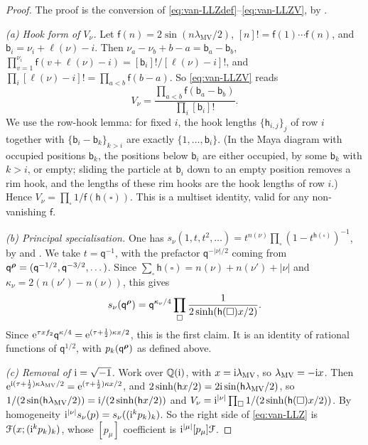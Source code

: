 \begin{proof}
The proof is the conversion of \eqref{eq:van-LLZdef}--\eqref{eq:van-LLZV}, by \cite[eq.~(1)--(3)]{LLZ03}.

\emph{(a) Hook form of $V_\nu$.} Let $\mathsf{f}(n)=2\sin(n\lambda_{\mathrm{MV}}/2)$, $[n]!=\mathsf{f}(1)\cdots\mathsf{f}(n)$, and $\mathsf{b}_i=\nu_i+\ell(\nu)-i$. Then $\nu_a-\nu_b+b-a=\mathsf{b}_a-\mathsf{b}_b$, $\prod_{v=1}^{\nu_i}\mathsf{f}(v+\ell(\nu)-i)=[\mathsf{b}_i]!/[\ell(\nu)-i]!$, and $\prod_i[\ell(\nu)-i]!=\prod_{a<b}\mathsf{f}(b-a)$. So \eqref{eq:van-LLZV} reads
\[
V_\nu=\frac{\prod_{a<b}\mathsf{f}(\mathsf{b}_a-\mathsf{b}_b)}{\prod_i[\mathsf{b}_i]!}.
\]
We use the row-hook lemma: for fixed $i$, the hook lengths $\{\mathsf{h}_{i,j}\}_j$ of row $i$ together with $\{\mathsf{b}_i-\mathsf{b}_k\}_{k>i}$ are exactly $\{1,\dots,\mathsf{b}_i\}$. (In the Maya diagram with occupied positions $\mathsf{b}_k$, the positions below $\mathsf{b}_i$ are either occupied, by some $\mathsf{b}_k$ with $k>i$, or empty; sliding the particle at $\mathsf{b}_i$ down to an empty position removes a rim hook, and the lengths of these rim hooks are the hook lengths of row $i$.) Hence $V_\nu=\prod_{\square}1/\mathsf{f}(\mathsf{h}(\square))$. This is a multiset identity, valid for any non-vanishing $\mathsf{f}$.

\emph{(b) Principal specialisation.} One has $s_\nu(1,t,t^2,\dots)=t^{n(\nu)}\prod_{\square}(1-t^{\mathsf{h}(\square)})^{-1}$, by \cite[eq.~(12)]{LLZ03} and \cite[I.3, Ex.~2]{Mac95}. We take $t=\mathsf{q}^{-1}$, with the prefactor $\mathsf{q}^{-\lvert\nu\rvert/2}$ coming from $\mathsf{q}^{\boldsymbol{\rho}}=(\mathsf{q}^{-1/2},\mathsf{q}^{-3/2},\dots)$. Since $\sum_{\square}\mathsf{h}(\square)=n(\nu)+n(\nu')+\lvert\nu\rvert$ and $\kappa_\nu=2(n(\nu')-n(\nu))$, this gives
\[
s_\nu(\mathsf{q}^{\boldsymbol{\rho}})=\mathsf{q}^{\kappa_\nu/4}\prod_{\square}\frac{1}{2\sinh(\mathsf{h}(\square)x/2)}.
\]
Since $\mathrm{e}^{\tau xf_2}\mathsf{q}^{\kappa/4}=\mathrm{e}^{(\tau+\frac12)\kappa x/2}$, this is the first claim. It is an identity of rational functions of $\mathsf{q}^{1/2}$, with $p_k(\mathsf{q}^{\boldsymbol{\rho}})$ as defined above.

\emph{(c) Removal of $\mathrm{i}=\sqrt{-1}$.} Work over $\mathbb{Q}(\mathrm{i})$, with $x=\mathrm{i}\lambda_{\mathrm{MV}}$, so $\lambda_{\mathrm{MV}}=-\mathrm{i} x$. Then $\mathrm{e}^{\mathrm{i}(\tau+\frac12)\kappa\lambda_{\mathrm{MV}}/2}=\mathrm{e}^{(\tau+\frac12)\kappa x/2}$, and $2\sinh(\mathsf{h}x/2)=2\mathrm{i}\sin(\mathsf{h}\lambda_{\mathrm{MV}}/2)$, so $1/(2\sin(\mathsf{h}\lambda_{\mathrm{MV}}/2))=\mathrm{i}/(2\sinh(\mathsf{h}x/2))$ and $V_\nu=\mathrm{i}^{\lvert\nu\rvert}\prod_{\square}1/(2\sinh(\mathsf{h}(\square)x/2))$. By homogeneity $\mathrm{i}^{\lvert\nu\rvert}s_\nu(p)=s_\nu((\mathrm{i}^kp_k)_k)$. So the right side of \eqref{eq:van-LLZ} is $\mathcal{F}(x;(\mathrm{i}^kp_k)_k)$, whose $[p_\mu]$ coefficient is $\mathrm{i}^{\lvert\mu\rvert}[p_\mu]\mathcal{F}$.


\end{proof}

